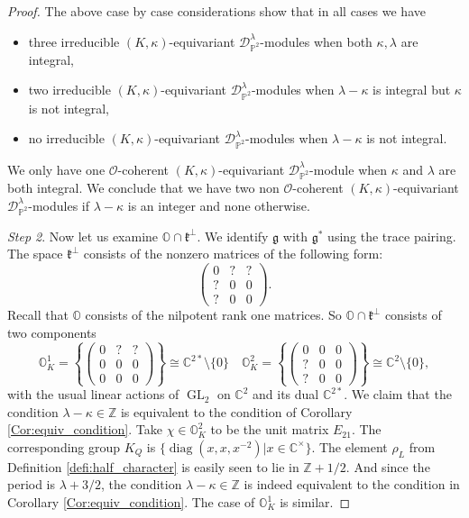 \documentclass[12pt]{amsart}
\newcommand{\C}{\mathbb{C}}
\newcommand{\g}{\mathfrak{g}}
\newcommand{\Orb}{\mathbb{O}}
\newcommand{\Z}{\mathbb{Z}}
\newcommand{\kf}{\mathfrak{k}}
\newcommand{\Pb}{\mathbb{P}}
\theoremstyle{definition}
\numberwithin{equation}{section}
\begin{document}
\begin{proof}
The above case by case considerations show that in all cases we have
\begin{itemize}
\item three irreducible
$(K,\kappa)$-equivariant $\mathscr{D}^\lambda_{\Pb^2}$-modules when both $\kappa,\lambda$
are integral,
\item two irreducible $(K,\kappa)$-equivariant $\mathscr{D}^\lambda_{\Pb^2}$-modules when $\lambda-\kappa$
is integral but $\kappa$ is not integral,
\item no irreducible $(K,\kappa)$-equivariant $\mathscr{D}^\lambda_{\Pb^2}$-modules when $\lambda-\kappa$
is not integral.
\end{itemize}
We only have one $\mathcal{O}$-coherent $(K,\kappa)$-equivariant $\mathscr{D}^\lambda_{\mathbb{P}^2}$-module
when $\kappa$ and $\lambda$ are both integral. We conclude that we have two non $\mathcal{O}$-coherent
$(K,\kappa)$-equivariant $\mathscr{D}^{\lambda}_{\mathbb{P}^2}$-modules if $\lambda-\kappa$ is an integer
and none otherwise.

{\it Step 2}.
Now let us examine $\Orb\cap \kf^\perp$. We identify $\g$ with $\g^*$ using the trace pairing. The space $\kf^\perp$ consists of the nonzero
matrices of the following form:
$$\begin{pmatrix}0&?&?\\
?&0&0\\?&0&0\end{pmatrix}.$$
Recall that $\Orb$ consists of the nilpotent rank one matrices. So $\Orb\cap \kf^\perp$
consists of two components
\[
  \Orb^1_K = \left\{
     \begin{pmatrix}
       0&?&?\\
       0&0&0\\
       0&0&0
    \end{pmatrix}
  \right\} \cong \C^{2*}\setminus \{0\}
  \quad
   \Orb^2_K = \left\{
  \begin{pmatrix}
  0&0&0\\
  ?&0&0\\
  ?&0&0
  \end{pmatrix}
  \right\} \cong \C^{2}\setminus \{0\},
\]
with the usual linear actions of $\operatorname{GL}_2$ on $\C^2$ and its dual $\C^{2*}$.
We claim that the condition $\lambda-\kappa\in \Z$ is equivalent to the condition of
Corollary \ref{Cor:equiv_condition}.
Take $\chi\in \Orb^2_K$ to be the unit matrix $E_{21}$. The corresponding group $K_Q$
is $\{\operatorname{diag}(x,x,x^{-2})| x\in \C^\times\}$.
The element $\rho_L$ from Definition \ref{defi:half_character}
is easily seen to lie in $\Z+1/2$. And since the period is $\lambda+3/2$, the condition
$\lambda-\kappa\in \Z$ is indeed equivalent to the condition in Corollary \ref{Cor:equiv_condition}.
The case of $\Orb^1_K$ is similar. 


\end{proof}
\end{document}
